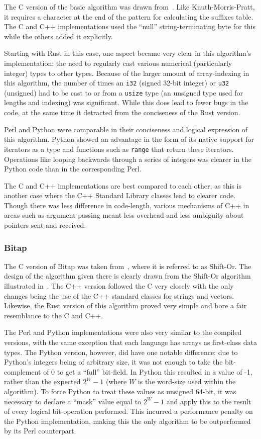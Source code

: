 The C version of the basic algorithm was drawn from~\cite[Chapter 14]{handbook.2004}. Like Knuth-Morris-Pratt, it requires a character at the end of the pattern for calculating the suffixes table. The C and C++ implementations used the ``null'' string-terminating byte for this while the others added it explicitly.

Starting with Rust in this case, one aspect became very clear in this algorithm's implementation: the need to regularly cast various numerical (particularly integer) types to other types. Because of the larger amount of array-indexing in this algorithm, the number of times an \texttt{i32} (signed 32-bit integer) or \texttt{u32} (unsigned) had to be cast to or from a \texttt{usize} type (an unsigned type used for lengths and indexing) was significant. While this does lead to fewer bugs in the code, at the same time it detracted from the conciseness of the Rust version.

Perl and Python were comparable in their conciseness and logical expression of this algorithm. Python showed an advantage in the form of its native support for iterators as a type and functions such as \texttt{range} that return these iterators. Operations like looping backwards through a series of integers was clearer in the Python code than in the corresponding Perl.

The C and C++ implementations are best compared to each other, as this is another case where the C++ Standard Library classes lead to clearer code. Though there was less difference in code-length, various mechanisms of C++ in areas such as argument-passing meant less overhead and less ambiguity about pointers sent and received.

\subsubsection{Bitap}

The C version of Bitap was taken from~\cite[Chapter 5]{handbook.2004}, where it is referred to as Shift-Or. The design of the algorithm given there is clearly drawn from the Shift-Or algorithm illustrated in~\cite{baeza.yates.gonnet.1992}. The C++ version followed the C very closely with the only changes being the use of the C++ standard classes for strings and vectors. Likewise, the Rust version of this algorithm proved very simple and bore a fair resemblance to the C and C++.

The Perl and Python implementations were also very similar to the compiled versions, with the same exception that each language has arrays as first-class data types. The Python version, however, did have one notable difference: due to Python's integers being of arbitrary size, it was not enough to take the bit-complement of 0 to get a ``full'' bit-field. In Python this resulted in a value of -1, rather than the expected $2^W - 1$ (where $W$ is the word-size used within the algorithm). To force Python to treat these values as unsigned 64-bit, it was necessary to declare a ``mask'' value equal to $2^W - 1$ and apply this to the result of every logical bit-operation performed. This incurred a performance penalty on the Python implementation, making this the only algorithm to be outperformed by its Perl counterpart.

